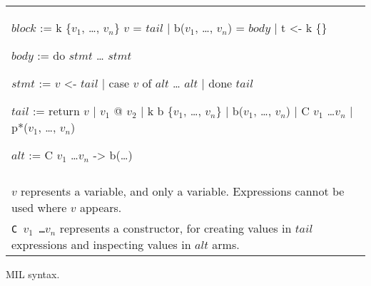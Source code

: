 \begin{myfig}[th]
\begin{tabular}{p{5in}}
\begin{center}
\begin{minipage}{4in}
\begin{AVerb}[numbers=left]
  $block$ := k \{$v_1$, \dots, $v_n$\} $v$ = $tail$ \label{mil_k1_fig3} 
    | b($v_1$, \dots, $v_n$) = $body$ \label{fig_mil3_b} 
    | t <- k \{\}  \label{mil_t_fig3} 

  $body$ := do \label{mil_body_fig3}
    $stmt$ 
    \dots 
    $stmt$

  $stmt$ := $v$ <- $tail$ \label{fig_mil3_stmt}  \label{mil_bind_fig3}
    | case $v$ of \label{mil_case_fig3}
        $alt$
        \dots
        $alt$
    | done $tail$ \label{mil_done_fig3}

  $tail$ := return $v$ \label{mil_return_fig3}
    | $v_1$ @ $v_2$ \label{mil_enter_fig3}
    | k b \{$v_1$, \dots, $v_n$\} \label{mil_capture_fig3}
    | b($v_1$, \dots, $v_n$) \label{mil_goto_fig3}
    | C $v_1$ \dots $v_n$ \label{mil_const_fig3}
    | p*($v_1$, \dots, $v_n$) \label{mil_prim_fig3}

  $alt$ := C $v_1$ \dots $v_n$ -> b(\dots) 
\end{AVerb}
\end{minipage}
\end{center} \\ \\
  $v$ represents a variable, and only a variable. Expressions
  cannot be used where $v$ appears. \\ 

  \texttt{C $v_1$ \dots $v_n$} represents a constructor, for creating
  values in $tail$ expressions and inspecting values in $alt$ arms. \\
\end{tabular}
\caption{MIL syntax.}
\label{mil_fig3}
\end{myfig}
